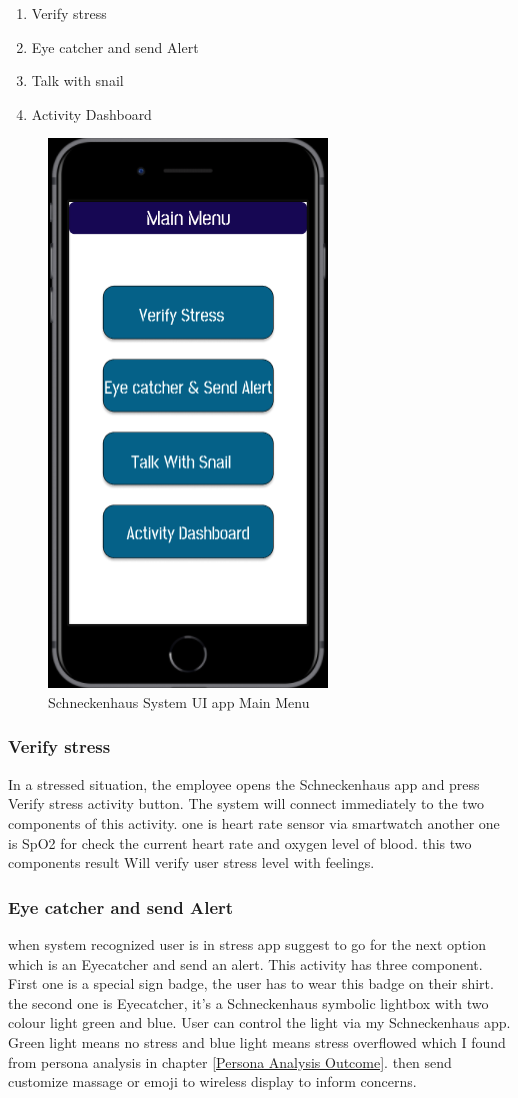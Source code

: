 \begin{enumerate}
    \item Verify stress
    \item Eye catcher and send Alert
    \item Talk with snail
    \item Activity Dashboard
\end{enumerate}

\begin{figure}[hbt!] 
  \centering
  \includegraphics[width=0.4\linewidth]{chap4/image4/SC2.png}
  \caption[Schneckenhaus System UI app Main Menu ]{Schneckenhaus System UI app Main Menu}
  \label{fig:main_menu}
\end{figure}

\subsubsection*{Verify stress}
In a stressed situation, the employee opens the Schneckenhaus app and press Verify stress activity button. The system will connect immediately to the two components of this activity. one is heart rate sensor via smartwatch another one is \acf{SpO2} for check the current heart rate and oxygen level of blood. this two components result Will verify user stress level with feelings. 
\subsubsection*{Eye catcher and send Alert}
when system recognized user is in stress app suggest to go for the next option which is an Eyecatcher and send an alert. This activity has three component. First one is a special sign badge, the user has to wear this badge on their shirt. the second one is Eyecatcher, it's a Schneckenhaus symbolic lightbox with two colour light green and blue. User can control the light via my Schneckenhaus app. Green light means no stress and blue light means stress overflowed which I found from persona analysis in chapter \ref{Persona Analysis Outcome}. then send customize massage or emoji to wireless display to inform concerns.
